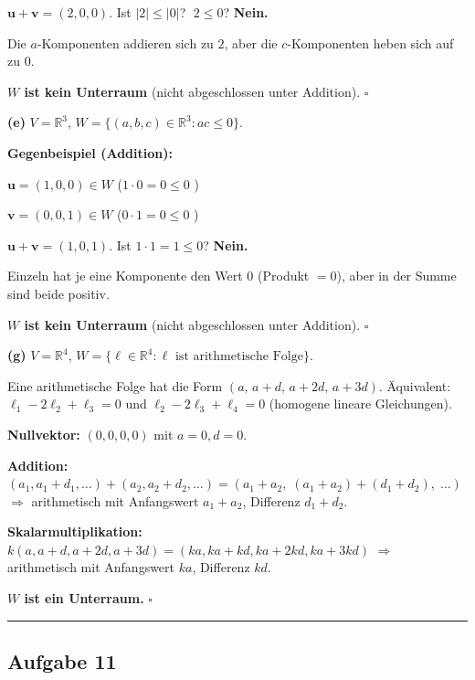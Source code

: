 \documentclass[a4paper,12pt]{article}
\begin{document}
$\mathbf{u} + \mathbf{v} = (2, 0, 0)$. \;Ist $|2| \leq |0|$? $\;2 \leq 0$? \textbf{Nein.}

Die $a$-Komponenten addieren sich zu $2$, aber die $c$-Komponenten heben sich auf zu $0$.

\textbf{$W$ ist kein Unterraum} (nicht abgeschlossen unter Addition). $\square$

\bigskip

\textbf{(e)} $V = \mathbb{R}^3$, \;$W = \{(a,b,c) \in \mathbb{R}^3 : ac \leq 0\}$.

\textbf{Gegenbeispiel (Addition):}

$\mathbf{u} = (1, 0, 0) \in W$ \;($1 \cdot 0 = 0 \leq 0$ \checkmark)

$\mathbf{v} = (0, 0, 1) \in W$ \;($0 \cdot 1 = 0 \leq 0$ \checkmark)

$\mathbf{u} + \mathbf{v} = (1, 0, 1)$. \;Ist $1 \cdot 1 = 1 \leq 0$? \textbf{Nein.}

Einzeln hat je eine Komponente den Wert $0$ (Produkt $= 0$), aber in der Summe sind beide positiv.

\textbf{$W$ ist kein Unterraum} (nicht abgeschlossen unter Addition). $\square$

\bigskip

\textbf{(g)} $V = \mathbb{R}^4$, \;$W = \{\ell \in \mathbb{R}^4 : \ell \text{ ist arithmetische Folge}\}$.

Eine arithmetische Folge hat die Form $(a,\, a{+}d,\, a{+}2d,\, a{+}3d)$.
\"Aquivalent: $\ell_1 - 2\ell_2 + \ell_3 = 0$ und $\ell_2 - 2\ell_3 + \ell_4 = 0$ (homogene lineare Gleichungen).

\textbf{Nullvektor:}
$(0,0,0,0)$ mit $a=0, d=0$. \;\checkmark

\textbf{Addition:}
$(a_1, a_1{+}d_1, \ldots) + (a_2, a_2{+}d_2, \ldots)
= (a_1{+}a_2,\; (a_1{+}a_2){+}(d_1{+}d_2),\; \ldots)$
$\Rightarrow$ arithmetisch mit Anfangswert $a_1{+}a_2$, Differenz $d_1{+}d_2$. \;\checkmark

\textbf{Skalarmultiplikation:}
$k(a, a{+}d, a{+}2d, a{+}3d) = (ka, ka{+}kd, ka{+}2kd, ka{+}3kd)$
$\Rightarrow$ arithmetisch mit Anfangswert $ka$, Differenz $kd$. \;\checkmark

\textbf{$W$ ist ein Unterraum.} $\square$

\bigskip
\hrule
\bigskip

\subsection*{Aufgabe 11}
\end{document}
